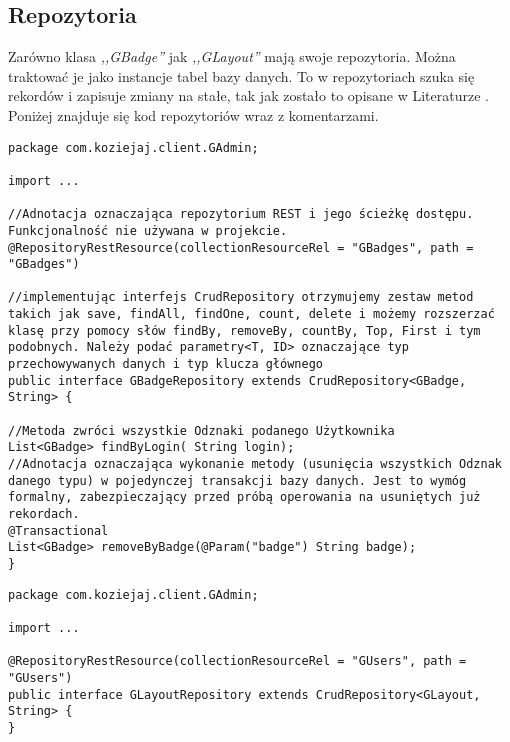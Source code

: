 \documentclass[a4paper,12pt,twoside,openany]{report}
\begin{document}
\subsection{Repozytoria}
Zarówno klasa \textit{,,GBadge''} jak \textit{,,GLayout''} mają swoje repozytoria. Można traktować je jako instancje tabel bazy danych. To w repozytoriach szuka się rekordów i zapisuje zmiany na stałe, tak jak zostało to opisane w Literaturze \cite{Spring}. Poniżej znajduje się kod repozytoriów wraz z komentarzami.
\begin{lstlisting}
package com.koziejaj.client.GAdmin;

import ...

//Adnotacja oznaczająca repozytorium REST i jego ścieżkę dostępu. Funkcjonalność nie używana w projekcie.
@RepositoryRestResource(collectionResourceRel = "GBadges", path = "GBadges")

//implementując interfejs CrudRepository otrzymujemy zestaw metod takich jak save, findAll, findOne, count, delete i możemy rozszerzać klasę przy pomocy słów findBy, removeBy, countBy, Top, First i tym podobnych. Należy podać parametry<T, ID> oznaczające typ przechowywanych danych i typ klucza głównego
public interface GBadgeRepository extends CrudRepository<GBadge, String> {

//Metoda zwróci wszystkie Odznaki podanego Użytkownika
List<GBadge> findByLogin( String login);
//Adnotacja oznaczająca wykonanie metody (usunięcia wszystkich Odznak danego typu) w pojedynczej transakcji bazy danych. Jest to wymóg formalny, zabezpieczający przed próbą operowania na usuniętych już rekordach.
@Transactional
List<GBadge> removeByBadge(@Param("badge") String badge);
}
\end{lstlisting}

\begin{lstlisting}
package com.koziejaj.client.GAdmin;

import ...

@RepositoryRestResource(collectionResourceRel = "GUsers", path = "GUsers")
public interface GLayoutRepository extends CrudRepository<GLayout, String> {
}

\end{lstlisting}
\end{document}
